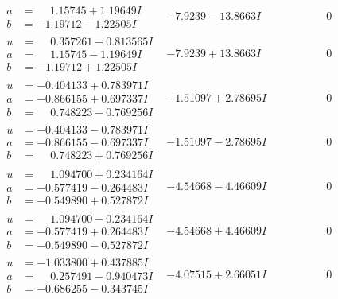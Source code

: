 \documentclass[1p]{elsarticle_modified}
\theoremstyle{definition}
\begin{document}
$$\begin{array}{c|c|c}
\begin{aligned}
a &= \phantom{-}1.15745 + 1.19649 I \\
b &= -1.19712 - 1.22505 I\end{aligned}
 & -7.9239 - 13.8663 I & \phantom{-0.000000 } 0 \\ \hline\begin{aligned}
u &= \phantom{-}0.357261 - 0.813565 I \\
a &= \phantom{-}1.15745 - 1.19649 I \\
b &= -1.19712 + 1.22505 I\end{aligned}
 & -7.9239 + 13.8663 I & \phantom{-0.000000 } 0 \\ \hline\begin{aligned}
u &= -0.404133 + 0.783971 I \\
a &= -0.866155 + 0.697337 I \\
b &= \phantom{-}0.748223 - 0.769256 I\end{aligned}
 & -1.51097 + 2.78695 I & \phantom{-0.000000 } 0 \\ \hline\begin{aligned}
u &= -0.404133 - 0.783971 I \\
a &= -0.866155 - 0.697337 I \\
b &= \phantom{-}0.748223 + 0.769256 I\end{aligned}
 & -1.51097 - 2.78695 I & \phantom{-0.000000 } 0 \\ \hline\begin{aligned}
u &= \phantom{-}1.094700 + 0.234164 I \\
a &= -0.577419 - 0.264483 I \\
b &= -0.549890 + 0.527872 I\end{aligned}
 & -4.54668 - 4.46609 I & \phantom{-0.000000 } 0 \\ \hline\begin{aligned}
u &= \phantom{-}1.094700 - 0.234164 I \\
a &= -0.577419 + 0.264483 I \\
b &= -0.549890 - 0.527872 I\end{aligned}
 & -4.54668 + 4.46609 I & \phantom{-0.000000 } 0 \\ \hline\begin{aligned}
u &= -1.033800 + 0.437885 I \\
a &= \phantom{-}0.257491 - 0.940473 I \\
b &= -0.686255 - 0.343745 I\end{aligned}
 & -4.07515 + 2.66051 I & \phantom{-0.000000 } 0 \\ \hline\begin{aligned}

\end{aligned}
\end{array}$$
\end{document}
